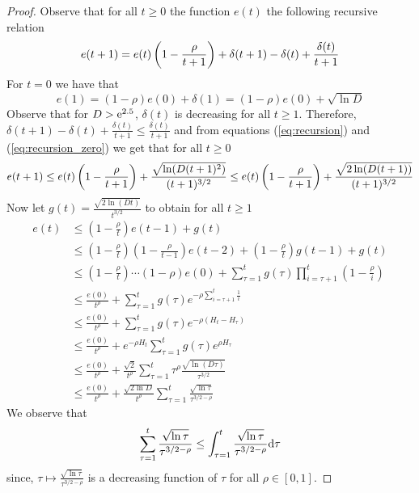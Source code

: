 \begin{proof}
  Observe that for all $t\geq 0$ the function $e(t)$ the following recursive
  relation
  \begin{equation}\label{eq:recursion}
    e(t+1) = e(t) \left(1 - \frac{\rho}{t+1} \right)
    + \delta(t+1)-\delta(t) + \frac{\delta(t)}{t+1}\\
  \end{equation}
  For $t=0$ we have that
  \begin{equation}\label{eq:recursion_zero}
    e(1) = (1- \rho)e(0) + \delta(1) = (1 -\rho)e(0) + \sqrt{\ln D}
  \end{equation}
  Observe that for $D>\mathrm{e}^{2.5}$, $\delta(t)$ is decreasing for all $t\geq 1$.
  Therefore, \(
    \delta(t+1)-\delta(t) + \frac{\delta(t)}{t+1}\leq \frac{\delta(t)}{t+1} \)
  and from equations (\ref{eq:recursion}) and (\ref{eq:recursion_zero})
  we get that for all $t\geq 0$
  \[
    e(t+1) \leq
    e(t) \left(1 - \frac{\rho}{t+1} \right) +
    \frac{\sqrt{\ln(D (t+1)^2)}}{(t+1)^{3/2}}
    \leq
    e(t) \left(1 - \frac{\rho}{t+1} \right) +
    \frac{\sqrt{2 \ln(D (t+1))}}{(t+1)^{3/2}}
  \]
  Now let \(g(t) = \frac{\sqrt{2 \ln(D t)}}{t^{3/2}} \) to obtain
  for all $t\geq 1$
  \begin{align*}
    e(t)
    &\leq
    (1-\frac{\rho}{t})e(t-1) + g(t)\\
    &\leq
    (1-\frac{\rho}{t})(1-\frac{\rho}{t-1})e(t-2)
    + (1-\frac{\rho}{t})g(t-1) + g(t)\\
    &\leq
    (1-\frac{\rho}{t})\cdots (1-\rho)e(0)
    + \sum_{\tau=1}^t g(\tau)\prod_{i=\tau+1}^t(1-\frac{\rho}{i})\\
    &\leq
    \frac{e(0)}{t^\rho}
    + \sum_{\tau=1}^tg(\tau)e^{-\rho\sum_{i=\tau+1}^t\frac{1}{i}}\\
    &\leq
    \frac{e(0)}{t^\rho}
    + \sum_{\tau=1}^tg(\tau)e^{-\rho(H_t-H_{\tau})}\\
    &\leq
    \frac{e(0)}{t^\rho}
    + e^{-\rho H_t}\sum_{\tau=1}^tg(\tau)e^{\rho H_{\tau}}\\
    &\leq
    \frac{e(0)}{t^\rho}
    + \frac{\sqrt{2}}{t^\rho}
    \sum_{\tau=1}^t\tau^\rho\frac{\sqrt{\ln (D \tau)}}{\tau^{3/2}}\\
    &\leq
    \frac{e(0)}{t^\rho}
    + \frac{\sqrt{2 \ln D }}{t^\rho}
    \sum_{\tau=1}^t\frac{\sqrt{\ln \tau}}{\tau^{3/2-\rho}}
  \end{align*}
  We observe that
  \begin{equation}\label{eq:integral_upper_bound}
    \sum_{\tau=1}^t
    \frac{\sqrt{\ln \tau}}{\tau^{3/2-\rho}}
    \leq
    \int_{\tau=1}^t \frac{\sqrt{\ln\tau}}{\tau^{3/2-\rho}}\mathrm{d} \tau
  \end{equation}
  since, \(\tau \mapsto \frac{\sqrt{\ln\tau}}{\tau^{3/2-\rho}}\)
  is a decreasing function of $\tau$ for all $\rho \in[0,1]$.


\end{proof}
